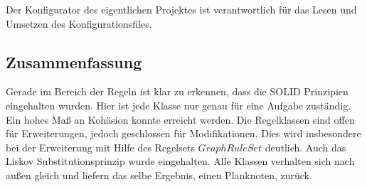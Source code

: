 Der Konfigurator des eigentlichen Projektes ist verantwortlich für das Lesen und Umsetzen des Konfigurationsfiles. 


\subsubsection{}


\subsection{Zusammenfassung}

Gerade im Bereich der Regeln ist klar zu erkennen, dass die SOLID Prinzipien eingehalten wurden. Hier ist jede Klasse nur genau für eine Aufgabe zuständig. Ein hohes Maß an Kohäsion konnte erreicht werden. Die Regelklassen  sind offen für Erweiterungen, jedoch geschlossen für Modifikationen. Dies wird insbesondere bei der Erweiterung mit Hilfe des Regelsets $GraphRuleSet$ deutlich. Auch das Liskov Substitutionsprinzip wurde eingehalten. Alle Klassen verhalten sich nach außen gleich und liefern das selbe Ergebnis, einen Planknoten, zurück. 